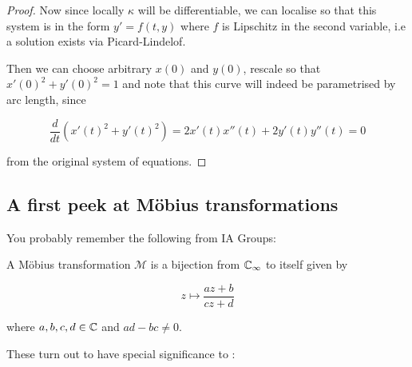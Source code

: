\documentclass[11pt]{scrartcl}
\begin{document}
\begin{theorem}
\begin{proof}
    Now since locally $\kappa$ will be differentiable, we can localise so that this system is in the form $y' = f(t, y)$ where $f$ is Lipschitz in the second variable, i.e a solution exists via Picard-Lindelof.

    Then we can choose arbitrary $x(0)$ and $y(0)$, rescale so that $x'(0)^2 + y'(0)^2 = 1$ and note that this curve will indeed be parametrised by arc length, since

    \begin{equation}
        \frac{d}{dt}(x'(t)^2 + y'(t)^2) = 2x'(t)x''(t) + 2y'(t)y''(t) = 0
    \end{equation}

    from the original system of equations.

% 


\end{proof}
\end{theorem}

\subsection{A first peek at M{\"o}bius transformations} %

You probably remember the following from IA Groups:

\begin{definition}
A M{\"o}bius transformation $\mathcal{M}$ is a bijection from $\mathbb C_\infty$ to itself given by 

\begin{equation}
    z \mapsto \frac{az+b}{cz+d}
\end{equation}

where $a,b,c,d \in \mathbb C$ and $ad-bc \neq 0$.
\end{definition}

These turn out to have special significance to :
\end{document}
